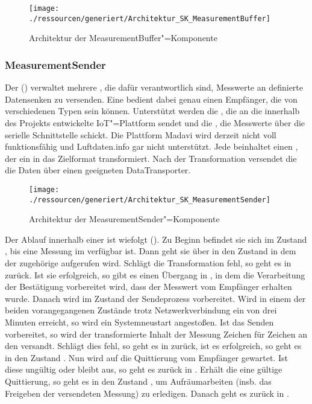 \begin{figure}[!htb]
    \centering
    \texttt{[image: ./ressourcen/generiert/Architektur\_SK\_MeasurementBuffer]}
    \caption{Architektur der MeasurementBuffer"=Komponente}
    \label{fig:Architektur_SK_MeasurementBuffer}
\end{figure}

\subsubsection{MeasurementSender}
Der  () verwaltet mehrere , die dafür verantwortlich sind, Messwerte an definierte Datensenken zu versenden.
Eine  bedient dabei genau einen Empfänger, die von verschiedenen Typen sein können.
Unterstützt werden die , die an die innerhalb des Projekts entwickelte IoT"=Plattform sendet und die , die Messwerte über die serielle Schnittstelle schickt.
Die Plattform Madavi wird derzeit nicht voll funktionsfähig und Luftdaten.info gar nicht unterstützt.
Jede  beinhaltet einen , der ein  in das Zielformat transformiert.
Nach der Transformation versendet die  die Daten über einen geeigneten DataTransporter.

\begin{figure}[!htb]
    \centering
    \texttt{[image: ./ressourcen/generiert/Architektur\_SK\_MeasurementSender]}
    \caption{Architektur der MeasurementSender"=Komponente}
    \label{fig:Architektur_SK_MeasurementSender}
\end{figure}

Der Ablauf innerhalb einer  ist wiefolgt ().
Zu Beginn befindet sie sich im Zustand , bis eine Messung im  verfügbar ist.
Dann geht sie über in den Zustand  in dem der zugehörige  aufgerufen wird.
Schlägt die Transformation fehl, so geht es in  zurück.
Ist sie erfolgreich, so gibt es einen Übergang in , in dem die Verarbeitung der Bestätigung vorbereitet wird, dass der Messwert vom Empfänger erhalten wurde.
Danach wird im Zustand  der Sendeprozess vorbereitet.
Wird in einem der beiden vorangegangenen Zustände trotz Netzwerkverbindung ein  von drei Minuten erreicht, so wird ein Systemneustart angestoßen.
Ist das Senden vorbereitet, so wird der transformierte Inhalt der Messung Zeichen für Zeichen an den  versandt.
Schlägt dies fehl, so geht es in  zurück, ist es erfolgreich, so geht es in den Zustand .
Nun wird auf die Quittierung vom Empfänger gewartet.
Ist diese ungültig oder bleibt aus, so geht es zurück in .
Erhält die  eine gültige Quittierung, so geht es in den Zustand , um Aufräumarbeiten (insb. das Freigeben der versendeten Messung) zu erledigen.
Danach geht es zurück in .

